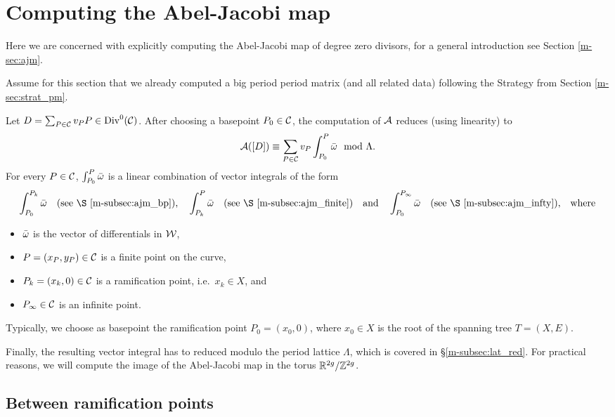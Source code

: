 \documentclass[main.tex]{subfiles}
\begin{document}
  \section{Computing the Abel-Jacobi map}\label{sec:comp_ajm}
  
   Here we are concerned with explicitly computing the Abel-Jacobi map of degree zero divisors, for a general introduction see Section \ref{m-sec:ajm}.
   
   Assume for this section that we already computed a big period period matrix (and all related data) following the Strategy from Section \ref{m-sec:strat_pm}. 
   
   Let $D = \sum_{P \in \mathcal{C}} v_P P \in \operatorname{Div}^0(\mathcal{C})$. After choosing a basepoint $P_0 \in \mathcal{C}$, the computation of $\mathcal{A}$ reduces (using linearity) to
   \begin{equation}
     \mathcal{A}([D]) \equiv \sum_{P \in \mathcal{C}} v_P \int_{P_0}^P \bar{\omega} \mod \Lambda.
   \end{equation}
  For every $P \in \mathcal{C}$, $\int_{P_0}^P \bar{\omega}$ is a linear combination of vector integrals of the form
  \begin{align*}
    \int_{P_0}^{P_k} \bar\w\quad \text{(see \S \ref{m-subsec:ajm_bp}),} \quad
    \int_{P_k}^{P} \bar\w \quad \text{(see \S \ref{m-subsec:ajm_finite})}
    \quad \text{and} \quad \int_{P_0}^{P_{\infty}} \bar\w\quad \text{(see \S \ref{m-subsec:ajm_infty}),} \quad \text{where}
  \end{align*}
  \begin{itemize}
   \item $\bar{\omega}$ is the vector of differentials in $\mathcal{W}$,
   \item $P = (x_P,y_P) \in \mathcal{C}$ is a finite point on the curve,
   \item $P_k = (x_k,0) \in \mathcal{C}$ is a ramification point, i.e.\ $x_k \in X$, and
   \item $P_{\infty} \in \mathcal{C}$ is an infinite point.
  \end{itemize}
  
   Typically, we choose as basepoint the ramification point $P_0 = (x_0,0)$, where $x_0 \in X$ is the root of the spanning tree $T = (X,E)$.
   
  Finally, the resulting vector integral has to reduced modulo the period lattice $\Lambda$, which is covered in \S \ref{m-subsec:lat_red}. For practical reasons, we will compute the
  image of the Abel-Jacobi map in the torus $\mathbb{R}^{2g} / \mathbb{Z}^{2g}$.
  
  
  \subsection{Between ramification points}\label{subsec:ajm_ram_pts}
\end{document}

